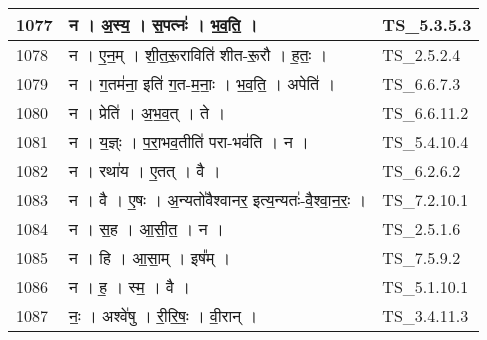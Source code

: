 \documentclass[17pt]{extarticle}
\begin{document}
\begin{longtable}{||p{0.4in}||p{4.9in}||p{0.9in}||}
    \hline
        
    1077 & न   ।   अ॒स्य॒   ।   स॒पत्नः॑   ।   भ॒व॒ति॒   ।    & TS\_5.3.5.3       \\
    
    \hline
        
    1078 & न   ।   ए॒न॒म्   ।   शी॒त॒रू॒राविति॑ शीत{-}रू॒रौ   ।   ह॒तः॒   ।    & TS\_2.5.2.4       \\
    
    \hline
        
    1079 & न   ।   ग॒तम॑ना॒ इति॑ ग॒त{-}म॒नाः॒   ।   भ॒व॒ति॒   ।   अपेति॑   ।    & TS\_6.6.7.3       \\
    
    \hline
        
    1080 & न   ।   प्रेति॑   ।   अ॒भ॒व॒त्   ।   ते   ।    & TS\_6.6.11.2       \\
    
    \hline
        
    1081 & न   ।   य॒ज्ञ्ः   ।   प॒रा॒भव॒तीति॑ परा{-}भव॑ति   ।   न   ।    & TS\_5.4.10.4       \\
    
    \hline
        
    1082 & न   ।   रथा॑य   ।   ए॒तत्   ।   वै   ।    & TS\_6.2.6.2       \\
    
    \hline
        
    1083 & न   ।   वै   ।   ए॒षः   ।   अ॒न्यतो॑वैश्वानर॒ इत्य॒न्यतः॑{-}वै॒श्वा॒न॒रः॒   ।    & TS\_7.2.10.1       \\
    
    \hline
        
    1084 & न   ।   स॒ह   ।   आ॒सी॒त॒   ।   न   ।    & TS\_2.5.1.6       \\
    
    \hline
        
    1085 & न   ।   हि   ।   आ॒सा॒म्   ।   इष᳚म्   ।    & TS\_7.5.9.2       \\
    
    \hline
        
    1086 & न   ।   ह॒   ।   स्म॒   ।   वै   ।    & TS\_5.1.10.1       \\
    
    \hline
        
    1087 & नः॒   ।   अश्वे॑षु   ।   री॒रि॒षः॒   ।   वी॒रान्   ।    & TS\_3.4.11.3       \\
    
    \hline
        

\end{longtable}
\end{document}
